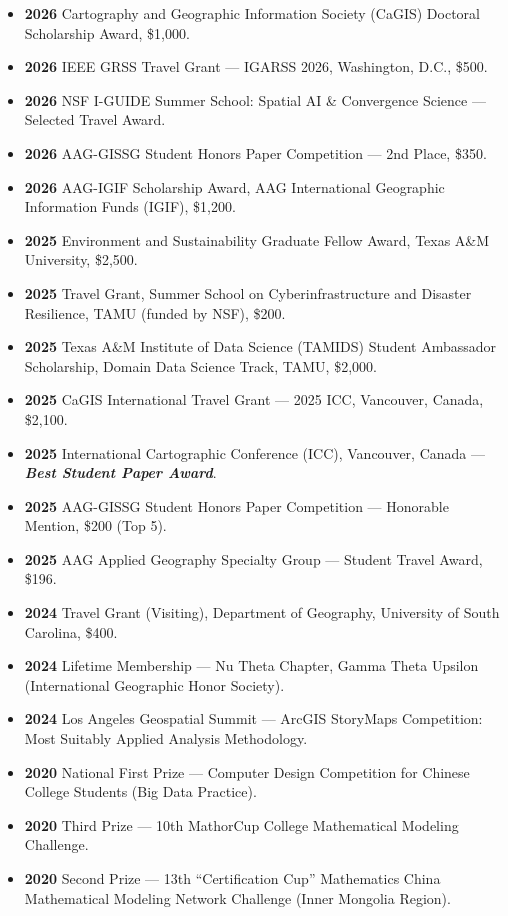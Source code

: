 \documentclass[10pt,letterpaper]{article}
\newenvironment{plainlist}
  {\begin{itemize}[leftmargin=1.1em,itemsep=0.10em,topsep=0.20em,parsep=0pt,label={}]}
  {\end{itemize}}
\newcommand{\award}[1]{\textbf{\textit{#1}}}
\newcommand{\dt}[1]{\textbf{#1}\hspace{0.6em}}
\begin{document}
\begin{plainlist}
  \item \dt{2026} Cartography and Geographic Information Society (CaGIS) Doctoral Scholarship Award, \$1,000.
  \item \dt{2026} IEEE GRSS Travel Grant --- IGARSS 2026, Washington, D.C., \$500.
  \item \dt{2026} NSF I-GUIDE Summer School: Spatial AI \& Convergence Science --- Selected Travel Award.
  \item \dt{2026} AAG-GISSG Student Honors Paper Competition --- 2nd Place, \$350.
  \item \dt{2026} AAG-IGIF Scholarship Award, AAG International Geographic Information Funds (IGIF), \$1,200.
  \item \dt{2025} Environment and Sustainability Graduate Fellow Award, Texas A\&M University, \$2,500.
  \item \dt{2025} Travel Grant, Summer School on Cyberinfrastructure and Disaster Resilience, TAMU (funded by NSF), \$200.
  \item \dt{2025} Texas A\&M Institute of Data Science (TAMIDS) Student Ambassador Scholarship, Domain Data Science Track, TAMU, \$2,000.
  \item \dt{2025} CaGIS International Travel Grant --- 2025 ICC, Vancouver, Canada, \$2,100.
  \item \dt{2025} International Cartographic Conference (ICC), Vancouver, Canada --- \award{Best Student Paper Award}.
  \item \dt{2025} AAG-GISSG Student Honors Paper Competition --- Honorable Mention, \$200 (Top 5).
  \item \dt{2025} AAG Applied Geography Specialty Group --- Student Travel Award, \$196.
  \item \dt{2024} Travel Grant (Visiting), Department of Geography, University of South Carolina, \$400.
  \item \dt{2024} Lifetime Membership --- Nu Theta Chapter, Gamma Theta Upsilon (International Geographic Honor Society).
  \item \dt{2024} Los Angeles Geospatial Summit --- ArcGIS StoryMaps Competition: Most Suitably Applied Analysis Methodology.
  \item \dt{2020} National First Prize --- Computer Design Competition for Chinese College Students (Big Data Practice).
  \item \dt{2020} Third Prize --- 10th MathorCup College Mathematical Modeling Challenge.
  \item \dt{2020} Second Prize --- 13th ``Certification Cup'' Mathematics China Mathematical Modeling Network Challenge (Inner Mongolia Region).

\end{plainlist}
\end{document}
